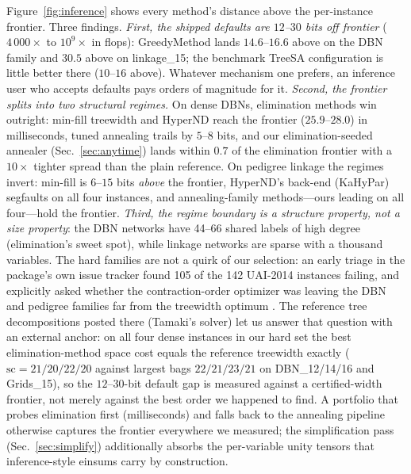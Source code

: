 \documentclass{SciPost}
\newcommand{\sct}{\ensuremath{\mathrm{sc}}}
\begin{document}
Figure~\ref{fig:inference} shows every method's distance above the
per-instance frontier. Three findings. \emph{First, the shipped defaults
are $12$--$30$ bits off frontier} ($4\,000\times$ to $10^9\times$ in
flops): GreedyMethod lands $14.6$--$16.6$ above on the DBN family and
$30.5$ above on linkage\_15; the benchmark TreeSA configuration is
little better there ($10$--$16$ above). Whatever mechanism one prefers,
an inference user who accepts defaults pays orders of magnitude for it.
\emph{Second, the frontier splits into two structural regimes.} On dense
DBNs, elimination methods win outright: min-fill treewidth and HyperND
reach the frontier ($25.9$--$28.0$) in milliseconds, tuned annealing
trails by $5$--$8$ bits, and our elimination-seeded annealer
(Sec.~\ref{sec:anytime}) lands within $0.7$ of the elimination frontier
with a $10\times$ tighter spread than the plain reference. On pedigree
linkage the regimes invert: min-fill is $6$--$15$ bits \emph{above} the
frontier, HyperND's back-end (KaHyPar) segfaults on all four instances,
and annealing-family methods---ours leading on all four---hold the
frontier. \emph{Third, the regime boundary is a structure property, not
a size property}: the DBN networks have 44--66 shared labels of high
degree (elimination's sweet spot), while linkage networks are sparse
with a thousand variables. The hard families are not a quirk of our
selection: an early triage in the package's own issue tracker found 105
of the 142 UAI-2014 instances failing, and explicitly asked whether the
contraction-order optimizer was leaving the DBN and pedigree families
far from the treewidth optimum \cite{roa_2022_ti_issue15}. The
reference tree decompositions posted there (Tamaki's solver) let us
answer that question with an external anchor: on all four dense
instances in our hard set the best elimination-method space cost equals
the reference treewidth exactly ($\sct = 21/20/22/20$ against largest
bags $22/21/23/21$ on DBN\_12/14/16 and Grids\_15), so the
$12$--$30$-bit default gap is measured against a certified-width
frontier, not merely against the best order we happened to find. A portfolio that probes elimination first
(milliseconds) and falls back to the annealing pipeline otherwise
captures the frontier everywhere we measured; the simplification pass
(Sec.~\ref{sec:simplify}) additionally absorbs the per-variable unity
tensors that inference-style einsums carry by construction.
\end{document}
